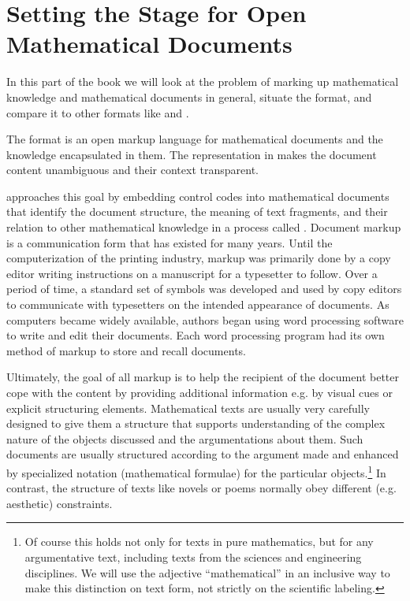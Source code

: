 
\part{Setting the Stage for Open Mathematical Documents}\label{part:markup}

  In this part of the book we will look at the problem of marking up mathematical
  knowledge and mathematical documents in general, situate the {\omdoc} format, and
  compare it to other formats like {\openmath} and {\mathml}.

  The {\omdoc} format is an open markup language for mathematical documents and the
  knowledge encapsulated in them. The representation in
  {\omdoc} makes the document content unambiguous and their context transparent.

  {\omdoc} approaches this goal by embedding control codes into mathematical documents that
  identify the document structure, the meaning of text fragments, and their relation to
  other mathematical knowledge in a process called {}.
  Document markup is a communication form that has existed for many years. Until the
  computerization of the printing industry, markup was primarily done by a copy editor
  writing instructions on a manuscript for a typesetter to follow. Over a period of time,
  a standard set of symbols was developed and used by copy editors to communicate with
  typesetters on the intended appearance of documents. As computers became widely
  available, authors began using word processing software to write and edit their
  documents.  Each word processing program had its own method of markup to store and
  recall documents.

  Ultimately, the goal of all markup is to help the recipient of the document better cope
  with the content by providing additional information e.g. by visual cues or explicit
  structuring elements. Mathematical texts are usually very carefully designed to give
  them a structure that supports understanding of the complex nature of the objects
  discussed and the argumentations about them.  Such documents are usually structured
  according to the argument made and enhanced by specialized notation (mathematical
  formulae) for the particular objects.\footnote{Of course this holds not only for texts
    in pure mathematics, but for any argumentative text, including texts from the sciences
    and engineering disciplines.  We will use the adjective ``mathematical'' in an
    inclusive way to make this distinction on text form, not strictly on the scientific
    labeling.}  In contrast, the structure of texts like novels or poems normally obey
  different (e.g. aesthetic) constraints.

